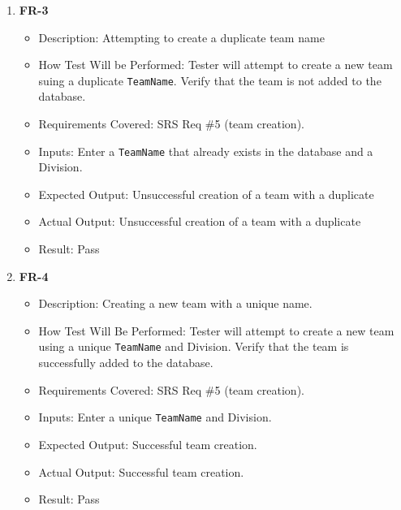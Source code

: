 \documentclass[12pt, titlepage]{article}
\begin{document}
\begin{enumerate}
       \item \textbf{FR-3}
          \begin{itemize}
              \item Description: Attempting to create a duplicate team name
              \item How Test Will be Performed: Tester will attempt to create a new team suing a duplicate \texttt{TeamName}. Verify that the team is not added to the database.
              \item Requirements Covered: SRS Req \#5 (team creation).
              \item Inputs: Enter a \texttt{TeamName} that already exists in the database and a Division.
              \item Expected Output: Unsuccessful creation of a team with a duplicate
              \item Actual Output: Unsuccessful creation of a team with a duplicate
              \item Result: Pass
          \end{itemize}

      \item \textbf{FR-4}  
      \begin{itemize}
          \item Description: Creating a new team with a unique name.
          \item How Test Will Be Performed: Tester will attempt to create a new team using a unique \texttt{TeamName} and Division. Verify that the team is successfully added to the database.
          \item Requirements Covered: SRS Req \#5 (team creation).
          \item Inputs: Enter a unique \texttt{TeamName} and Division.
          \item Expected Output: Successful team creation.
          \item Actual Output: Successful team creation.
          \item Result: Pass
      \end{itemize}


\end{enumerate}
\end{document}
